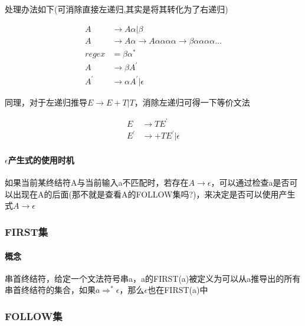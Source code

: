 \documentclass[UTF8]{ctexart} %
\begin{document}
处理办法如下(可消除直接左递归,其实是将其转化为了右递归)

\begin{equation}
    \begin{aligned}
        A     & \rightarrow A\alpha|\beta              \\
        A     & \rightarrow A\alpha
        \rightarrow A\alpha\alpha\alpha\alpha
        \rightarrow \beta\alpha\alpha\alpha\alpha\dots \\
        regex & =\beta\alpha^*                         \\
        A     & \rightarrow \beta A^{'}                \\
        A^{'} & \rightarrow \alpha A^{'}|\epsilon
    \end{aligned}
\end{equation}

同理，对于左递归推导$E\rightarrow E+T|T$，消除左递归可得一下等价文法

\begin{equation}
    \begin{aligned}
        E     & \rightarrow TE^{'}           \\
        E^{'} & \rightarrow +TE^{'}|\epsilon
    \end{aligned}
\end{equation}

\paragraph{$\epsilon$产生式的使用时机} 如果当前某终结符A与当前输入a不匹配时，若存在$A\rightarrow\epsilon$，可以通过检查a是否可以出现在A的后面(那不就是查看A的FOLLOW集吗?)，来决定是否可以使用产生式$A\rightarrow\epsilon$

\subsubsection{FIRST集}

\paragraph{概念} 串首终结符，给定一个文法符号串a，a的FIRST(a)被定义为可以从a推导出的所有串首终结符的集合，如果$a\Rightarrow^* \epsilon$，那么$\epsilon$也在FIRST(a)中

\subsubsection{FOLLOW集}
\end{document}
